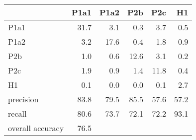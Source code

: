 \begin{tabular}{lrrrrr}
\toprule
{} &  P1a1 &  P1a2 &  P2b &  P2c &   H1 \\
\midrule
P1a1             &  31.7 &   3.1 &  0.3 &  3.7 &  0.5 \\
P1a2             &   3.2 &  17.6 &  0.4 &  1.8 &  0.9 \\
P2b              &   1.0 &   0.6 & 12.6 &  3.1 &  0.2 \\
P2c              &   1.9 &   0.9 &  1.4 & 11.8 &  0.4 \\
H1               &   0.1 &   0.0 &  0.0 &  0.1 &  2.7 \\
precision        &  83.8 &  79.5 & 85.5 & 57.6 & 57.2 \\
recall           &  80.6 &  73.7 & 72.1 & 72.2 & 93.1 \\
overall accuracy &  76.5 &       &      &      &      \\
\bottomrule
\end{tabular}
